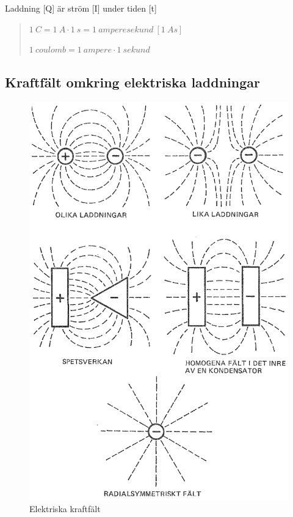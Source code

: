 Laddning [Q] är ström [I] under tiden [t]

\begin{quote}
\(1\ C = 1\ A \cdot 1\ s = 1\ amperesekund\ [1\ As]\)

\(1\ coulomb = 1\ ampere \cdot 1\ sekund\)
\end{quote}

\subsection{Kraftfält omkring elektriska laddningar}

\begin{figure}
\begin{center}
\includegraphics[width=\textwidth]{images/cropped_pdfs/bild_2_1-05.pdf}
\caption{Elektriska kraftfält}
\label{fig:BildII1-5}
\end{center}
\end{figure}

